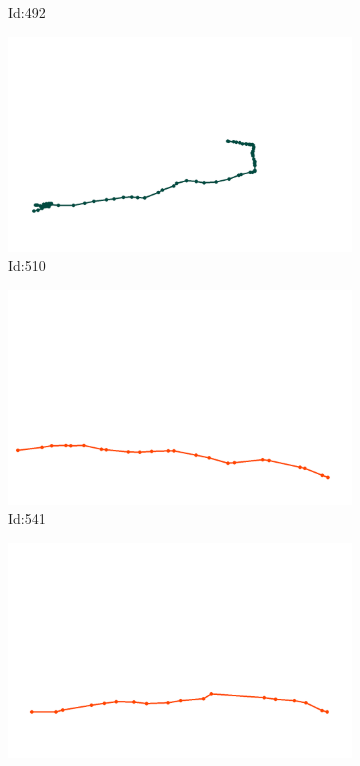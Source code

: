 \documentclass[12pt,twoside]{report}
\begin{document}
\begin{figure}
\begin{subfigure}[b]{0.20\textwidth}
\caption{Id:492}
\end{subfigure}
\begin{subfigure}[b]{0.20\textwidth}
\centering
\includegraphics[width=\textwidth]{../trajectories/510.png}
\caption{Id:510}
\end{subfigure}
\begin{subfigure}[b]{0.20\textwidth}
\centering
\includegraphics[width=\textwidth]{../trajectories/541.png}
\caption{Id:541}
\end{subfigure}
\begin{subfigure}[b]{0.20\textwidth}
\centering
\includegraphics[width=\textwidth]{../trajectories/555.png}

\end{subfigure}
\end{figure}
\end{document}

